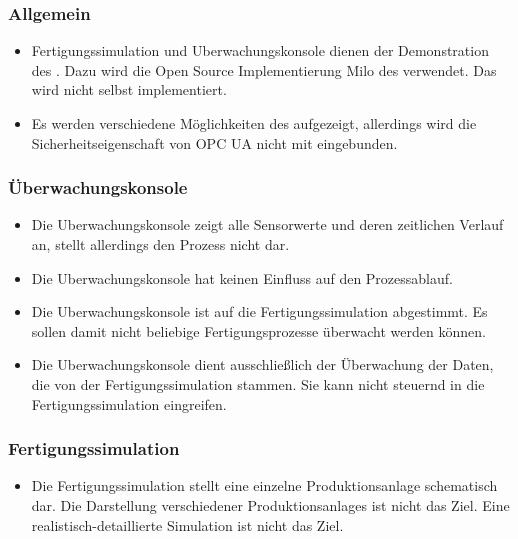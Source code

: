 \documentclass[parskip=full]{scrartcl}
\begin{document}
\subsubsection{Allgemein}
\begin{itemize}
  \item \gls{Fertigungssimulation} und \gls{Uberwachungskonsole} dienen der Demonstration des . Dazu wird die Open Source
    Implementierung \gls{Milo} des  verwendet. Das  wird nicht selbst implementiert.
  \item Es werden verschiedene Möglichkeiten des  aufgezeigt, allerdings wird die Sicherheitseigenschaft von \gls{OPC UA} nicht mit eingebunden.
\end{itemize}

\subsubsection{Überwachungskonsole}
\begin{itemize}
  \item Die \gls{Uberwachungskonsole} zeigt alle Sensorwerte und deren zeitlichen Verlauf an, stellt allerdings den Prozess nicht dar.
  \item Die \gls{Uberwachungskonsole} hat keinen Einfluss auf den Prozessablauf.
  \item Die \gls{Uberwachungskonsole} ist auf die \gls{Fertigungssimulation} abgestimmt. Es sollen damit nicht beliebige
    Fertigungsprozesse \"uberwacht werden k\"onnen.
  \item Die \gls{Uberwachungskonsole} dient ausschlie{\ss}lich der \"Uberwachung der Daten, die von der \gls{Fertigungssimulation}
    stammen. Sie kann nicht steuernd in die \gls{Fertigungssimulation} eingreifen.
\end{itemize}

\subsubsection{Fertigungssimulation}
\begin{itemize}
  \item Die \gls{Fertigungssimulation} stellt eine einzelne \gls{Produktionsanlage} schematisch dar. Die Darstellung verschiedener \glspl{Produktionsanlage}
    ist nicht das Ziel. Eine realistisch-detaillierte Simulation ist nicht das Ziel.
\end{itemize}
\end{document}
